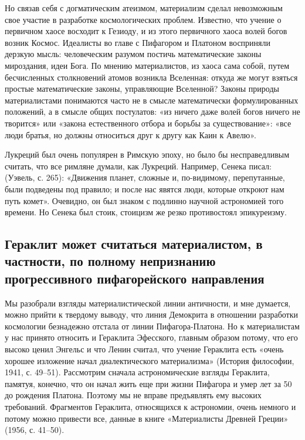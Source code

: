 Но   связав  себя   с  догматическим   атеизмом,  материализм   сделал
невозможным  свое   участие  в  разработке   космологических  проблем.
Известно,  что учение  о  первичном  хаосе восходит  к  Гезиоду, и  из
этого  первичного  хаоса  волей  богов  возник  Космос.  Идеалисты  во
главе с  Пифагором и  Платоном восприняли дерзкую  мысль: человеческим
разумом  постичь  математические  законы  мироздания,  идеи  Бога.  По
мнению  материалистов,   из  хаоса  сама  собой,   путем  бесчисленных
столкновений  атомов  возникла  Вселенная:  откуда  же  могут  взяться
простые   математические   законы,   управляющие   Вселенной?   Законы
природы  материалистами понимаются  часто  не  в смысле  математически
формулированных  положений, а  в смысле  общих постулатов:  «из ничего
даже волей богов ничего не  творится» или «закона естественного отбора
и борьбы  за существование»:  «все люди  братья, но  должны относиться
друг к другу как Каин к Авелю».

Лукреций   был  очень   популярен  в   Римскую  эпоху,   но  было   бы
несправедливым  считать,   что  все  римляне  думали,   как  Лукреций.
Например, Сенека писал: (Уэвель, с. 265): «Движения планет, сложные и,
по-видимому,  перепутанные, были  подведены под  правило; и  после нас
явятся люди, которые откроют нам  путь комет». Очевидно, он был знаком
с  подлинно научной  астрономией того  времени. Но  Сенека был  стоик,
стоицизм же резко противостоял эпикуреизму.

\subsection{Гераклит  может считаться  материалистом, в  частности, по
полному непризнанию прогрессивного пифагорейского направления}

Мы  разобрали  взгляды  материалистической  линии  античности,  и  мне
думается,  можно  прийти  к   твердому  выводу,  что  линия  Демокрита
в  отношении   разработки  космологии  безнадежно  отстала   от  линии
Пифагора-Платона.  Но  к  материалистам   у  нас  принято  относить  и
Гераклита  Эфесского, главным  образом  потому, что  его высоко  ценил
Энгельс и что  Ленин считал, что учение Гераклита  есть «очень хорошее
изложение  начал  диалектического  материализма»  (История  философии,
1941,   с.  49--51).   Рассмотрим   сначала  астрономические   взгляды
Гераклита, памятуя, конечно, что он  начал жить еще при жизни Пифагора
и  умер  лет  за  50  до   рождения  Платона.  Поэтому  мы  не  вправе
предъявлять ему высоких  требований. Фрагментов Гераклита, относящихся
к  астрономии, очень  немного и  потому можно  привести все,  данные в
книге «Материалисты Древней Греции» (1956, с. 41--50).

